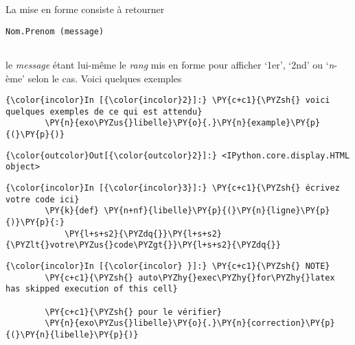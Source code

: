     La mise en forme consiste à retourner

\begin{verbatim}
Nom.Prenom (message)
 
\end{verbatim}

le \emph{message} étant lui-même le \emph{rang} mis en forme pour
afficher `1er', `2nd' ou `\emph{n}-ème' selon le cas. Voici quelques
exemples

    \begin{Verbatim}[commandchars=\\\{\}]
{\color{incolor}In [{\color{incolor}2}]:} \PY{c+c1}{\PYZsh{} voici quelques exemples de ce qui est attendu}
        \PY{n}{exo\PYZus{}libelle}\PY{o}{.}\PY{n}{example}\PY{p}{(}\PY{p}{)}
\end{Verbatim}


\begin{Verbatim}[commandchars=\\\{\}]
{\color{outcolor}Out[{\color{outcolor}2}]:} <IPython.core.display.HTML object>
\end{Verbatim}
            
    \begin{Verbatim}[commandchars=\\\{\}]
{\color{incolor}In [{\color{incolor}3}]:} \PY{c+c1}{\PYZsh{} écrivez votre code ici}
        \PY{k}{def} \PY{n+nf}{libelle}\PY{p}{(}\PY{n}{ligne}\PY{p}{)}\PY{p}{:}
            \PY{l+s+s2}{\PYZdq{}}\PY{l+s+s2}{\PYZlt{}votre\PYZus{}code\PYZgt{}}\PY{l+s+s2}{\PYZdq{}}
\end{Verbatim}


    \begin{Verbatim}[commandchars=\\\{\}]
{\color{incolor}In [{\color{incolor} }]:} \PY{c+c1}{\PYZsh{} NOTE}
        \PY{c+c1}{\PYZsh{} auto\PYZhy{}exec\PYZhy{}for\PYZhy{}latex has skipped execution of this cell}
        
        \PY{c+c1}{\PYZsh{} pour le vérifier}
        \PY{n}{exo\PYZus{}libelle}\PY{o}{.}\PY{n}{correction}\PY{p}{(}\PY{n}{libelle}\PY{p}{)}
\end{Verbatim}



    
    
    
